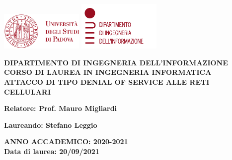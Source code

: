 \begin{titlepage}
  \begin{center}
    \includegraphics[width=0.3\textwidth]{images/unipd.png}
    \hfill
    \includegraphics[width=0.3\textwidth]{images/dei.png}
  \end{center}
  \begin{center}
    \vspace{3cm}
    \large
    \MakeUppercase{
      \textbf{
        Dipartimento di ingegneria dell'informazione\\
        \vspace{0.5cm}
        Corso di laurea in Ingegneria Informatica\\
      }
    }
    \vspace{4cm}
    \MakeUppercase{
      \textbf{
        Attacco di tipo Denial of Service alle reti cellulari\\
      }
    }
    \vspace{4cm}
    \begin{flushleft}
      \textbf{
        Relatore: Prof. Mauro Migliardi\\
      }
    \end{flushleft}
    \vspace{1cm}
    \begin{flushright}
      \textbf{
        Laureando: Stefano Leggio\\
      }
    \end{flushright}
    \vspace{2.5cm}
    \MakeUppercase{
      \textbf{
        Anno accademico: 2020-2021\\
      }
    }
    \vspace{0.5cm}
    \textbf{
      Data di laurea: 20/09/2021
    }
  \end{center}
\end{titlepage}